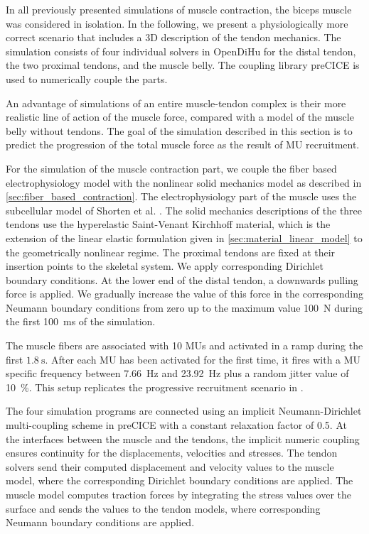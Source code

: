 In all previously presented simulations of muscle contraction, the biceps muscle was considered in isolation. In the following, we present a  physiologically more correct scenario that includes a 3D description of the tendon mechanics.
The simulation consists of four individual solvers in OpenDiHu for the distal tendon, the two proximal tendons, and the muscle belly.
The coupling library preCICE is used to numerically couple the parts.

An advantage of simulations of an entire muscle-tendon complex is their more realistic line of action of the muscle force, compared with a model of the muscle belly without tendons. The goal of the simulation described in this section is to predict the progression of the total muscle force as the result of MU recruitment.

For the simulation of the muscle contraction part, we couple the fiber based electrophysiology model with the nonlinear solid mechanics model as described in \cref{sec:fiber_based_contraction}. The electrophysiology part of the muscle uses the subcellular model of Shorten et al. \cite{Shorten2007}. 
The solid mechanics descriptions of the three tendons use the hyperelastic Saint-Venant Kirchhoff material, which is the extension of the linear elastic formulation given in \cref{sec:material_linear_model} to the geometrically nonlinear regime.
The proximal tendons are fixed at their insertion points to the skeletal system. We apply corresponding Dirichlet boundary conditions. At the lower end of the distal tendon, a downwards pulling force is applied. We gradually increase the value of this force in the corresponding Neumann boundary conditions from zero up to the maximum value \SI{100}{\newton} during the first \SI{100}{\ms} of the simulation.

The muscle fibers are associated with 10 MUs and activated in a ramp during the first $\SI{1.8}{\s}$. After each MU has been activated for the first time, it fires with a MU specific frequency between \SI{7.66}{\hertz} and \SI{23.92}{\hertz} plus a random jitter value of \SI{10}{\percent}. This setup replicates the progressive recruitment scenario in \cite{Klotz2020}.

The four simulation programs are connected using an implicit Neumann-Dirichlet multi-coupling scheme in preCICE with a constant relaxation factor of 0.5. At the interfaces between the muscle and the tendons, the implicit numeric coupling ensures continuity for the displacements, velocities and stresses.
The tendon solvers send their computed displacement and velocity values to the muscle model, where the corresponding Dirichlet boundary conditions are applied. The muscle model computes traction forces by integrating the stress values over the surface and sends the values to the tendon models, where corresponding Neumann boundary conditions are applied. 

